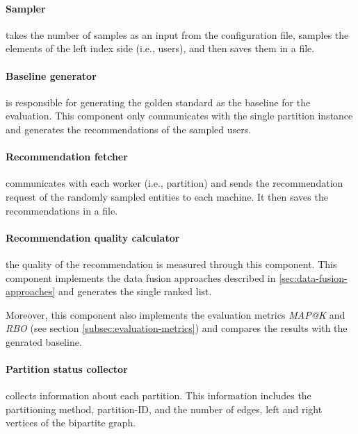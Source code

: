 \paragraph{Sampler}
takes the number of samples as an input from the configuration file, samples the elements of the left index side (i.e., users), and then saves them in a file.

\paragraph{Baseline generator}
is responsible for generating the golden standard as the baseline for the evaluation. This component only communicates with the single partition instance and generates the recommendations of the sampled users.

\paragraph{Recommendation fetcher}
communicates with each worker (i.e., partition) and sends the recommendation request of the randomly sampled entities to each machine. It then saves the recommendations in a file.

\paragraph{Recommendation quality calculator}
the quality of the recommendation is measured through this component. This component implements the data fusion approaches described in \ref{sec:data-fusion-approaches} and generates the single ranked list.

Moreover, this component also implements the evaluation metrics \emph{MAP@K} and \emph{RBO} (see section \ref{subsec:evaluation-metrics}) and compares the results with the genrated baseline.

\paragraph{Partition status collector}
collects information about each partition. This information includes the partitioning method, partition-ID, and the number of edges, left and right vertices of the bipartite graph.

